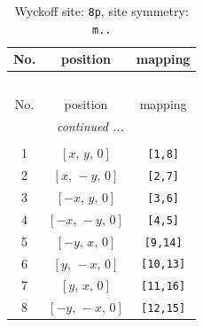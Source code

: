 \documentclass[fleqn,8pt]{jsarticle}
\begin{document}
\renewcommand{\arraystretch}{1.2}
\begin{longtable}{ccc}
\caption{Wyckoff site: {\tt 8p}, site symmetry: {\tt m..}}
 \\
 \hline \hline
No. & position & mapping \\ \hline \endfirsthead

\multicolumn{2}{l}{\tablename\ \thetable{}} \\
 \hline \hline
No. & position & mapping \\ \hline \endhead

 \hline \hline
\multicolumn{2}{r}{\footnotesize\it continued ...} \\ \endfoot

 \hline \hline
\multicolumn{2}{r}{} \\ \endlastfoot

1 & $\left[ x,\, y,\, 0 \right]$ & {\tt [1,8]} \\ \hline
2 & $\left[ x,\, - y,\, 0 \right]$ & {\tt [2,7]} \\ \hline
3 & $\left[ - x,\, y,\, 0 \right]$ & {\tt [3,6]} \\ \hline
4 & $\left[ - x,\, - y,\, 0 \right]$ & {\tt [4,5]} \\ \hline
5 & $\left[ - y,\, x,\, 0 \right]$ & {\tt [9,14]} \\ \hline
6 & $\left[ y,\, - x,\, 0 \right]$ & {\tt [10,13]} \\ \hline
7 & $\left[ y,\, x,\, 0 \right]$ & {\tt [11,16]} \\ \hline
8 & $\left[ - y,\, - x,\, 0 \right]$ & {\tt [12,15]} \\
\end{longtable}
\renewcommand{\arraystretch}{1.2}
\end{document}
